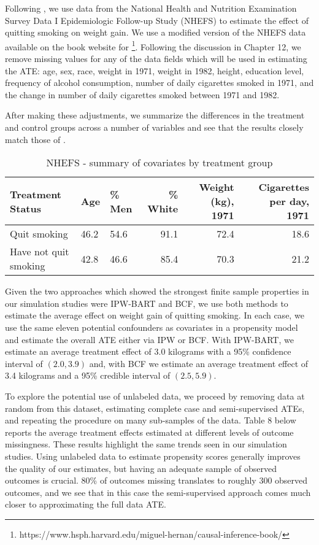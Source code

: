 \documentclass[aos]{imsart}
\begin{document}
Following \cite{hernan2020causal}, we use data from the National Health and Nutrition Examination Survey Data I Epidemiologic Follow-up Study (NHEFS) 
to estimate the effect of quitting smoking on weight gain. 
We use a modified version of the NHEFS data available on the book website for \cite{hernan2020causal}\footnote{https://www.hsph.harvard.edu/miguel-hernan/causal-inference-book/}. 
Following the discussion in Chapter 12, we remove missing values for any of the data fields which will be used in estimating the ATE: age, sex, race, weight in 1971, weight in 1982, height, 
education level, frequency of alcohol consumption, number of daily cigarettes smoked in 1971, and the change in number of daily cigarettes smoked between 1971 and 1982.

After making these adjustments, we summarize the differences in the treatment and control groups across a number of variables and see that the results closely match those of \cite{hernan2020causal}.

\begin{table}[ht]
\centering
\begingroup\small
\begin{tabular}{lllrrr}
  \hline
Treatment Status & Age & \% Men & \% White & Weight (kg), 1971 & Cigarettes per day, 1971 \\ 
  \hline
Quit smoking & 46.2 & 54.6 & 91.1 & 72.4 & 18.6 \\ 
Have not quit smoking & 42.8 & 46.6 & 85.4 & 70.3 & 21.2 \\ 
   \hline
\end{tabular}
\endgroup
\caption{NHEFS - summary of covariates by treatment group} 
\end{table}

Given the two approaches which showed the strongest finite sample properties in our simulation studies were IPW-BART and BCF, we use 
both methods to estimate the average effect on weight gain of quitting smoking.
In each case, we use the same eleven potential confounders as covariates in a propensity model and estimate the overall ATE either via IPW or BCF.
With IPW-BART, we estimate an average treatment effect of 3.0 kilograms with a 95\% confidence interval of $(2.0, 3.9)$ and, with BCF we estimate an 
average treatment effect of 3.4 kilograms and a 95\% credible interval of $(2.5, 5.9)$.

To explore the potential use of unlabeled data, we proceed by removing data at random from this dataset, estimating complete case and semi-supervised ATEs, and repeating the procedure 
on many sub-samples of the data. Table 8 below reports the average treatment effects estimated at different levels of outcome missingness.
These results highlight the same trends seen in our simulation studies. Using unlabeled data to estimate propensity scores generally improves the quality of our estimates, but having an 
adequate sample of observed outcomes is crucial. 80\% of outcomes missing translates to roughly 300 observed outcomes, and we see that in this case the semi-supervised approach comes 
much closer to approximating the full data ATE.
\end{document}

